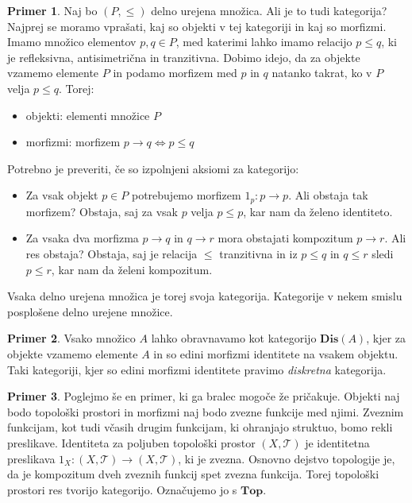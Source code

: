 \documentclass[12pt,a4paper]{book}
\theoremstyle{definition}
\theoremstyle{plain}
\theoremstyle{definition}
\newtheorem{primer}{Primer}[section]
\theoremstyle{remark}
\newcommand{\cat}[1]{\textbf{#1}}
\begin{document}
\begin{primer}
Naj bo $(P, \leq)$ delno urejena množica. Ali je to tudi kategorija? Najprej se moramo vprašati, kaj so objekti v tej kategoriji in kaj so morfizmi.
Imamo množico elementov $p,q \in P$, med katerimi lahko imamo relacijo $p \leq q$, ki je refleksivna, antisimetrična in tranzitivna. Dobimo idejo, da za objekte vzamemo elemente $P$ in podamo morfizem med $p$ in $q$ natanko takrat, ko v $P$ velja $p \leq q$.
Torej: 
\begin{itemize}
\item objekti: elementi množice $P$
\item morfizmi: morfizem $p \rightarrow q \Leftrightarrow p \leq q$
\end{itemize}
Potrebno je preveriti, če so izpolnjeni aksiomi za kategorijo:

\begin{itemize}
\item Za vsak objekt $p \in P$ potrebujemo morfizem $1_p : p \to p$. Ali obstaja tak morfizem? Obstaja, saj za vsak $p$ velja $p \leq p$, kar nam da želeno identiteto.
\item Za vsaka dva morfizma $p \to q$ in $q \to r$ mora obstajati kompozitum $p \to r$. Ali res obstaja? Obstaja, saj je relacija $\leq$ tranzitivna in iz $p \leq q$ in $q \leq r$ sledi $p \leq r$, kar nam da želeni kompozitum.
\end{itemize}
Vsaka delno urejena množica je torej svoja kategorija. Kategorije v nekem smislu posplošene delno urejene množice.
\end{primer}



\begin{primer}
Vsako množico $A$ lahko obravnavamo kot kategorijo $\cat{Dis}(A)$, kjer za objekte vzamemo elemente $A$ in so edini morfizmi identitete na vsakem objektu. Taki kategoriji, kjer so edini morfizmi identitete pravimo \emph{diskretna} kategorija.
\end{primer}

\begin{primer}
Poglejmo še en primer, ki ga bralec mogoče že pričakuje. Objekti naj bodo topološki prostori in morfizmi naj bodo zvezne funkcije med njimi. Zveznim funkcijam, kot tudi včasih drugim funkcijam, ki ohranjajo struktuo, bomo rekli preslikave. Identiteta za poljuben topološki prostor $(X, \mathcal{T})$ je identitetna preslikava $1_X : (X, \mathcal{T}) \to (X, \mathcal{T})$, ki je zvezna. Osnovno dejstvo topologije je, da je kompozitum dveh zveznih funkcij spet zvezna funkcija. Torej topološki prostori res tvorijo kategorijo. Označujemo jo s $\cat{Top}$.
\end{primer}
\end{document}
